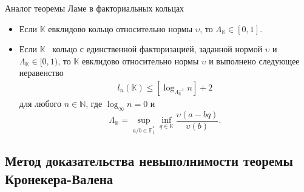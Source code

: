 \documentclass[8pt, xcolor=x11names]{beamer}
\begin{document}
\begin{frame}
    \begin{block}{Аналог теоремы Ламе в факториальных кольцах}
        \begin{itemize}
            \item Если $\mathbb{K}$ евклидово кольцо относительно нормы $\upsilon$, то $\Lambda_{\mathbb{K}}\in[0,1]$.
    
            \item Если $\mathbb{K}$ \textendash\ кольцо с единственной факторизацией, заданной нормой $\upsilon$ и $\Lambda_{\mathbb{K}}\in[0,1)$, то $\mathbb{K}$ евклидово относительно нормы $\upsilon$ и выполнено следующее неравенство
            \begin{eqnarray*}
                l_{n}(\mathbb{K})\le[\log_{\Lambda_{\mathbb{K}}^{-1}} n]+2
            \end{eqnarray*}
            для любого $n\in\mathbb{N}$, где $\log_{\infty} n=0$ и 
            $$
                \Lambda_{\mathbb{K}} = \sup_{a/b \in \mathbb{F}^*_1} \inf_{q\in \mathbb{K}} \frac{\upsilon(a-bq)}{\upsilon(b)}.
            $$
        \end{itemize}
    \end{block}
\end{frame}

\subsection{Метод доказательства невыполнимости теоремы Кронекера-Валена}
\end{document}
